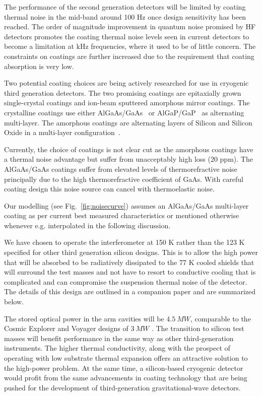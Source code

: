 \documentclass[prx,superscriptaddress,twocolumn,nopreprintnumbers,floatfix,nofootinbib]{revtex4}
\begin{document}
The performance of the second generation detectors will be limited by coating thermal noise in the mid-band around 100 Hz once design sensitivity has been reached. The order of magnitude improvement in quantum noise promised by HF detectors promotes the coating thermal noise levels seen in current detectors to become a limitation at kHz frequencies, where it used to be of little concern. The constraints on coatings are further increased due to the requirement that coating absorption is very low.

Two potential coating choices are being actively researched for use in cryogenic third generation detectors. The two promising coatings are epitaxially grown single-crystal coatings and ion-beam sputtered amorphous mirror coatings. The crystalline coatings use either AlGaAs/GaAs~\cite{cole2008algaas,cole2013algaas-nature,penn2019algaas} or AlGaP/GaP~\cite{lin2013algap,cumming2015algap,murray2017algap} as alternating multi-layer. The amorphous coatings are alternating layers of Silicon and Silicon Oxide in a multi-layer configuration~\cite{steinlechner2016aSi,birney2018aSi}.

Currently, the choice of coatings is not clear cut as the amorphous coatings have a thermal noise advantage but suffer from unacceptably high loss (20 ppm). The AlGaAs/GaAs coatings suffer from elevated levels of thermorefractive noise principally due to the high thermorefractive coefficient of GaAs. With careful coating design this noise source can cancel with thermoelastic noise. 

Our modelling (see Fig.~\ref{fig:noisecurve}) assumes an AlGaAs/GaAs multi-layer coating as per current best measured characteristics or mentioned otherwise whenever e.g. interpolated in the following discussion. 

We have chosen to operate the interferometer at 150 K rather than the 123 K specified for other third generation silicon designs. This is to allow the high power that will be absorbed to be radiatively dissipated to the 77 K cooled shields that will surround the test masses and not have to resort to conductive cooling \cite{Eichholz2020} that is complicated and can compromise the suspension thermal noise of the detector. The details of this design are outlined in a companion paper \cite{Eichholz2020} and are summarized below.

The stored optical power in the arm cavities will be $4.5~MW$, comparable to the Cosmic Explorer and Voyager designs of $3~MW$ \cite{reitze2019cosmic}\cite{voyager-arxiv}. The transition to silicon test masses will benefit performance in the same way as other third-generation instruments. The higher thermal conductivity, along with the prospect of operating with low substrate thermal expansion offers an attractive solution to the high-power problem. At the same time, a silicon-based cryogenic detector would profit from the same advancements in coating technology that are being pushed for the development of third-generation gravitational-wave detectors. 
\end{document}
